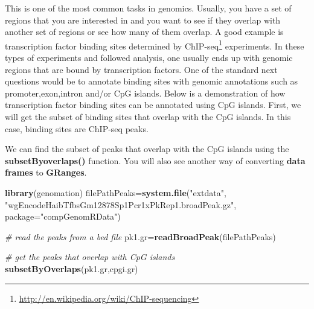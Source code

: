 \documentclass[12pt,]{krantz}
\newenvironment{Shaded}{\begin{snugshade}}{\end{snugshade}}
\newcommand{\CommentTok}[1]{\textcolor[rgb]{0.56,0.35,0.01}{\textit{#1}}}
\newcommand{\DataTypeTok}[1]{\textcolor[rgb]{0.13,0.29,0.53}{#1}}
\newcommand{\KeywordTok}[1]{\textcolor[rgb]{0.13,0.29,0.53}{\textbf{#1}}}
\newcommand{\NormalTok}[1]{#1}
\newcommand{\StringTok}[1]{\textcolor[rgb]{0.31,0.60,0.02}{#1}}
\renewcommand{\href}[2]{#2\footnote{\url{#1}}}
\begin{document}
This is one of the most common tasks in genomics. Usually, you have a set of regions that you are interested in and you want to see if they overlap with another set of regions or see how many of them overlap. A good example is transcription factor binding sites determined by \href{http://en.wikipedia.org/wiki/ChIP-sequencing}{ChIP-seq} experiments. In these types of experiments and followed analysis, one usually ends up with genomic regions that are bound by transcription factors. One of the standard next questions would be to annotate binding sites with genomic annotations such as promoter,exon,intron and/or CpG islands. Below is a demonstration of how transcription factor binding sites can be annotated using CpG islands. First, we will get the subset of binding sites that overlap with the CpG islands. In this case, binding sites are ChIP-seq peaks.

We can find the subset of peaks that overlap with the CpG islands using the \textbf{subsetByoverlaps()} function. You will also see another way of converting \textbf{data frames} to \textbf{GRanges}.

\begin{Shaded}
\begin{Highlighting}[]
\KeywordTok{library}\NormalTok{(genomation)}
\NormalTok{filePathPeaks=}\KeywordTok{system.file}\NormalTok{(}\StringTok{"extdata"}\NormalTok{,             }\StringTok{"wgEncodeHaibTfbsGm12878Sp1Pcr1xPkRep1.broadPeak.gz"}\NormalTok{,}
                      \DataTypeTok{package=}\StringTok{"compGenomRData"}\NormalTok{)}

\CommentTok{# read the peaks from a bed file}
\NormalTok{pk1.gr=}\KeywordTok{readBroadPeak}\NormalTok{(filePathPeaks)}

\CommentTok{# get the peaks that overlap with CpG islands}
\KeywordTok{subsetByOverlaps}\NormalTok{(pk1.gr,cpgi.gr)}
\end{Highlighting}
\end{Shaded}
\end{document}
